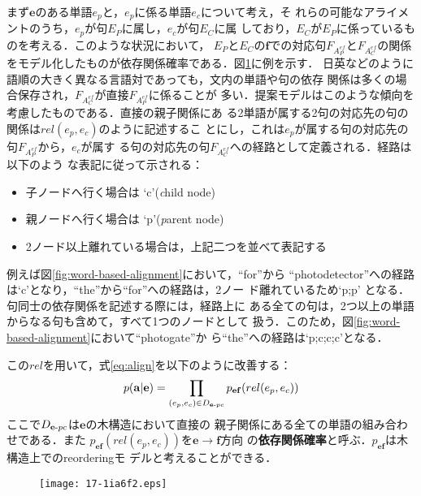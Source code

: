\documentclass[japanese]{jnlp_1.4}
\begin{document}
まず$\mathbf{e}$のある単語$e_p$と，$e_p$に係る単語$e_c$について考え，そ
れらの可能なアライメントのうち，$e_p$が句$E_P$に属し，$e_c$が句$E_C$に属
しており，$E_C$が$E_P$に係っているものを考える．このような状況において，
$E_P$と$E_C$の$\mathbf{f}$での対応句$F_{A_P^{ef}}$と$F_{A_C^{ef}}$の関係
をモデル化したものが依存関係確率である．図\ref{fig:dpnd_prob}に例を示す．
日英などのように語順の大きく異なる言語対であっても，文内の単語や句の依存
関係は多くの場合保存され，$F_{A_C^{ef}}$が直接$F_{A_P^{ef}}$に係ることが
多い．提案モデルはこのような傾向を考慮したものである．直接の親子関係にあ
る2単語が属する2句の対応先の句の関係は$rel(e_p, e_c)$のように記述するこ
とにし，これは$e_p$が属する句の対応先の句$F_{A_P^{ef}}$から，$e_c$が属す
る句の対応先の句$F_{A_C^{ef}}$への経路として定義される．経路は以下のよう
な表記に従って示される：
\begin{itemize}
 \item 子ノードへ行く場合は `c'({\it c}hild node) 
 \item 親ノードへ行く場合は `p'({\it p}arent node) 
 \item 2ノード以上離れている場合は，上記二つを並べて表記する 
\end{itemize}
例えば図\ref{fig:word-based-alignment}において，``for''から
``photodetector''への経路は`c'となり，``the''から``for''への経路は，2ノー
ド離れているため`p;p' となる．句同士の依存関係を記述する際には，経路上に
ある全ての句は，2つ以上の単語からなる句も含めて，すべて1つのノードとして
扱う．このため，図\ref{fig:word-based-alignment}において``photogate''か
ら``the''への経路は`p;c;c;c'となる．

この$rel$を用いて，式\ref{eq:align}を以下のように改善する：
\begin{equation}
 \label{relation_probability}
 p(\mathbf{a}|\mathbf{e}) = \prod_{(e_p,e_c) \in D_{\mathbf{e}\mathchar`-pc}} p_{\mathbf{ef}}(rel(e_p, e_c))
\end{equation}
ここで$D_{\mathbf{e}\mathchar`-pc}$は$\mathbf{e}$の木構造において直接の
親子関係にある全ての単語の組み合わせである．また
$p_{\mathbf{ef}}(rel(e_p, e_c))$を$\mathbf{e}\rightarrow\mathbf{f}$方向
の{\bf 依存関係確率}と呼ぶ．$p_{\mathbf{ef}}$は木構造上でのreorderingモ
デルと考えることができる．

\begin{figure}[t]
 \begin{center}
  \texttt{[image: 17-1ia6f2.eps]}
 \end{center}
  \label{fig:dpnd_prob}
\end{figure}
\end{document}
